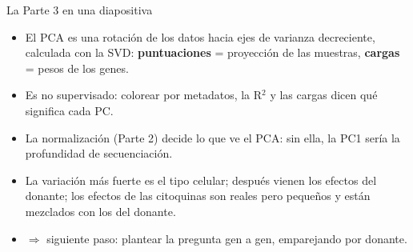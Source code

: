 \begin{frame}{La Parte 3 en una diapositiva}
  \begin{itemize}\setlength\itemsep{7pt}
    \item El PCA es una \alert{rotación} de los datos hacia ejes de varianza decreciente, calculada con la \alert{SVD}: \textbf{puntuaciones} = proyección de las muestras, \textbf{cargas} = pesos de los genes.
    \item Es \alert{no supervisado}: colorear por metadatos, la R$^2$ y las cargas dicen qué significa cada PC.
    \item La \alert{normalización} (Parte 2) decide lo que ve el PCA: sin ella, la PC1 sería la profundidad de secuenciación.
    \item La variación más fuerte es el \alert{tipo celular}; después vienen los efectos del donante; los efectos de las citoquinas son reales pero pequeños y están \alert{mezclados con los del donante}.
    \item $\Rightarrow$ siguiente paso: plantear la pregunta gen a gen, emparejando por donante.
  \end{itemize}
\end{frame}
